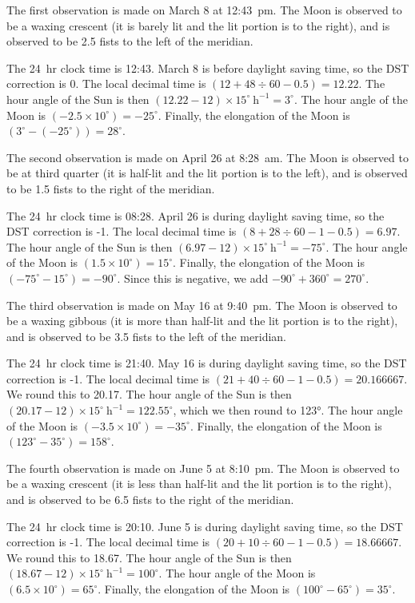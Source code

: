 \documentclass{article}
\begin{document}
The first observation is made on March 8 at 12:43~pm. The Moon is observed to be a waxing crescent (it is barely lit and the lit portion is to the right), and is observed to be 2.5 fists to the left of the meridian.

The 24~hr clock time is 12:43. March 8 is before daylight saving time, so the DST correction is 0. The local decimal time is $(12 + 48\div60 - 0.5) = 12.22$. The hour angle of the Sun is then $(12.22 - 12)\times15^\circ~\mathrm{h}^{-1} = 3^\circ$. The hour angle of the Moon is $(-2.5\times10^\circ) = -25^\circ$. Finally, the elongation of the Moon is $(3^\circ - (-25^\circ)) = 28^\circ$.

The second observation is made on April 26 at 8:28~am. The Moon is observed to be at third quarter (it is half-lit and the lit portion is to the left), and is observed to be 1.5 fists to the right of the meridian.

The 24~hr clock time is 08:28. April 26 is during daylight saving time, so the DST correction is -1. The local decimal time is $(8 + 28\div60 - 1 - 0.5) = 6.97$. The hour angle of the Sun is then $(6.97 - 12)\times15^\circ~\mathrm{h}^{-1} = -75^\circ$. The hour angle of the Moon is $(1.5\times10^\circ) = 15^\circ$. Finally, the elongation of the Moon is $(-75^\circ - 15^\circ) = -90^\circ$. Since this is negative, we add $-90^\circ + 360^\circ = 270^\circ$.

The third observation is made on May 16 at 9:40~pm. The Moon is observed to be a waxing gibbous (it is more than half-lit and the lit portion is to the right), and is observed to be 3.5 fists to the left of the meridian.

The 24~hr clock time is 21:40. May 16 is during daylight saving time, so the DST correction is -1. The local decimal time is $(21 + 40\div60 - 1 - 0.5) = 20.166667$. We round this to 20.17. The hour angle of the Sun is then $(20.17 - 12)\times15^\circ~\mathrm{h}^{-1} = 122.55^\circ$, which we then round to 123°. The hour angle of the Moon is $(-3.5\times10^\circ) = -35^\circ$. Finally, the elongation of the Moon is $(123^\circ - 35^\circ) = 158^\circ$.

The fourth observation is made on June 5 at 8:10~pm. The Moon is observed to be a waxing crescent (it is less than half-lit and the lit portion is to the right), and is observed to be 6.5 fists to the right of the meridian.

The 24~hr clock time is 20:10. June 5 is during daylight saving time, so the DST correction is -1. The local decimal time is $(20 + 10\div60 - 1 - 0.5) = 18.66667$. We round this to 18.67. The hour angle of the Sun is then $(18.67 - 12)\times15^\circ~\mathrm{h}^{-1} = 100^\circ$. The hour angle of the Moon is $(6.5\times10^\circ) = 65^\circ$. Finally, the elongation of the Moon is $(100^\circ - 65^\circ) = 35^\circ$.
\end{document}
